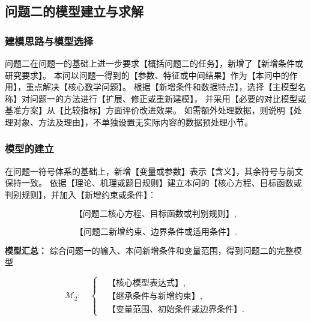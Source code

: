 
\subsection{问题二的模型建立与求解}

\subsubsection{建模思路与模型选择}

问题二在问题一的基础上进一步要求【概括问题二的任务】，新增了【新增条件或研究要求】。
本问以问题一得到的【参数、特征或中间结果】作为【本问中的作用】，重点解决【核心数学问题】。
根据【新增条件和数据特点】，选择【主模型名称】对问题一的方法进行【扩展、修正或重新建模】，
并采用【必要的对比模型或基准方案】从【比较指标】方面评价改进效果。
如需额外处理数据，则说明【处理对象、方法及理由】，不单独设置无实际内容的数据预处理小节。

\subsubsection{模型的建立}

在问题一符号体系的基础上，新增【变量或参数】表示【含义】，其余符号与前文保持一致。
依据【理论、机理或题目规则】建立本问的【核心方程、目标函数或判别规则】，并加入【新增约束或条件】：

\begin{equation}
  \text{【问题二核心方程、目标函数或判别规则】},
  \label{eq:q2_core}
\end{equation}

\begin{equation}
  \text{【问题二新增约束、边界条件或适用条件】}.
  \label{eq:q2_constraint}
\end{equation}

\noindent\textbf{模型汇总：}
综合问题一的输入、本问新增条件和变量范围，得到问题二的完整模型

\begin{equation}
  \mathcal{M}_2:\quad
  \left\{
  \begin{aligned}
    &\text{【核心模型表达式】},\\
    &\text{【继承条件与新增约束】},\\
    &\text{【变量范围、初始条件或边界条件】}.
  \end{aligned}
  \right.
  \label{eq:q2_summary}
\end{equation}

